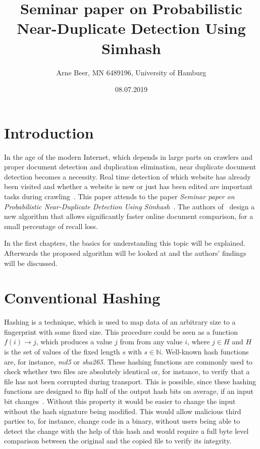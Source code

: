 \documentclass[12pt,twocolumn,a4paper,DIV=calc]{scrartcl}
\begin{document}
\title{Seminar paper on Probabilistic Near-Duplicate Detection Using Simhash}
\author{Arne Beer, MN 6489196, University of Hamburg}
\date{08.07.2019}

\maketitle


\section{Introduction}

In the age of the modern Internet, which depends in large parts on crawlers and proper document detection and duplication elimination, near duplicate document detection becomes a necessity.
Real time detection of which website has already been visited and whether a website is new or just has been edited are important tasks during crawling~\cite{paper:scaling_six_billion}.
This paper attends to the paper \emph{Seminar paper on Probabilistic Near-Duplicate Detection Using Simhash}~\cite{inproc:main}. The authors of~\cite{inproc:main} design a new algorithm that allows significantly faster online document comparison, for a small percentage of recall loss.

In the first chapters, the basics for understanding this topic will be explained.
Afterwards the proposed algorithm will be looked at and the authors' findings will be discussed.

\section{Conventional Hashing}

Hashing is a technique, which is used to map data of an arbitrary size to a fingerprint with some fixed size.
This procedure could be seen as a function  $f(i) \rightarrow j$, which produces a value $j$ from from any value $i$, where $j \in H$ and $H$ is the set of values of the fixed length $s$ with $s \in \mathbb{N}$.
Well-known hash functions are, for instance, \emph{md5} or \emph{sha265}.
These hashing functions are commonly used to check whether two files are absolutely identical or, for instance, to verify that a file has not been corrupted during transport.
This is possible, since these hashing functions are designed to flip half of the output hash bits on average, if an input bit changes~\cite{book:hashing}.
Without this property it would be easier to change the input without the hash signature being modified.
This would allow malicious third parties to, for instance, change code in a binary, without users being able to detect the change with the help of this hash and would require a full byte level comparison between the original and the copied file to verify its integrity.
\end{document}
